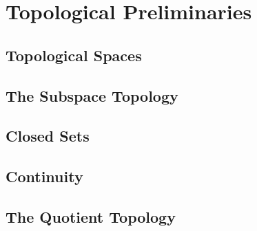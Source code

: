 \section{Topological Preliminaries}
\label{sec:prelims}

\subsection{Topological Spaces}
\label{sec:prelims:topospace}

\subsection{The Subspace Topology}
\label{sec:prelims:subspace}

\subsection{Closed Sets}
\label{sec:prelims:closed}

\subsection{Continuity}
\label{sec:prelims:continuity}

\subsection{The Quotient Topology}
\label{sec:prelims:quotient}


